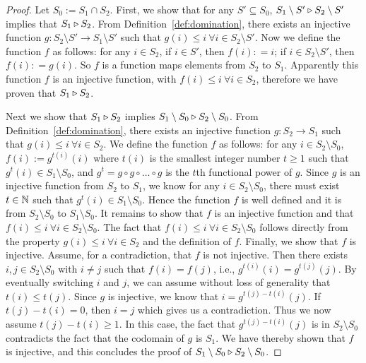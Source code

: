 \begin{proof}
Let $S_0 := S_1 \cap S_2$. First, we show that for any $S' \subseteq S_0$, $S_1 \setminus S' \triangleright S_2 \setminus S'$ implies that $S_1 \triangleright S_2$. 
From Definition~\ref{def:domination}, there exists an injective function $g: S_2 \setminus S' \to S_1 \setminus S'$ such that $g(i) \leq i \ \forall i \in S_2 \setminus S'$. Now we define the function $f$ as follows: for any $i \in S_2$, if $i \in S'$, then $f(i): = i$; if $i \in S_2 \setminus S'$, then $f(i): = g(i)$. So $f$ is a function maps elements from $S_2$ to $S_1$. Apparently this function $f$ is an injective function, with $f(i) \leq i \ \forall i \in S_2$, therefore we have proven that $S_1 \triangleright S_2$. 

Next we show that $S_1 \triangleright S_2$ implies $S_1 \setminus S_0 \triangleright S_2 \setminus S_0$. From Definition~\ref{def:domination}, there exists an injective function $g : S_2 \to S_1$ such that $g(i) \leq i \ \forall i \in S_2$. %
We define the function $f$ as follows: for any $i \in S_2 \setminus S_0$, $f(i) := g^{t(i)}(i)$ where $t(i)$ is the smallest integer number $t \ge 1$ such that $g^t(i) \in S_1 \setminus S_0$, and $g^t = g \circ g \circ \ldots \circ g$ is the $t$th functional power of $g$. 
Since $g$ is an injective function from $S_2$ to $S_1$, we know for any $i \in S_2 \setminus S_0$, there must exist $t \in \mathbb{N}$ such that $g^t(i) \in S_1 \setminus S_0$. 
Hence the function $f$ is well defined and it is from $S_2 \setminus S_0$ to $S_1 \setminus S_0$. It remains to show that $f$ is an injective function and that $f(i) \leq i \ \forall i \in S_2 \setminus S_0$. 
The fact that $f(i) \leq i \ \forall i \in S_2 \setminus S_0$ follows directly from the property $g(i) \leq i \ \forall i \in S_2$ and the definition of $f$. %
Finally, we show that $f$ is injective.
Assume, for a contradiction, that $f$ is not injective.
Then there exists $i, j \in S_2 \setminus S_0$ with $i \neq j$ such that $f(i) = f(j)$, i.e., $g^{t(i)}(i) = g^{t(j)}(j)$. 
By eventually switching $i$ and $j$, we can assume without loss of generality that $t(i) \leq t(j)$. 
Since $g$ is injective, we know that $i = g^{t(j) - t(i)} (j)$. 
If $t(j) - t(i) = 0$, then $i = j$ which gives us a contradiction. 
Thus we now assume $t(j) - t(i) \geq 1.$ 
In this case, the fact that $g^{t(j) - t(i)} (j)$ is in $S_2 \setminus S_0$ contradicts the fact that the codomain of $g$ is $S_1$.
We have thereby shown that $f$ is injective, and this concludes the proof of $S_1 \setminus S_0 \triangleright S_2 \setminus S_0$. 



\end{proof}
